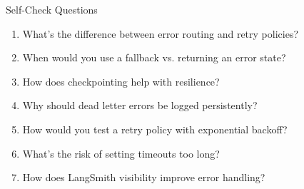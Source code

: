 \documentclass[aspectratio=169,11pt]{beamer}
\begin{document}
\begin{frame}{Self-Check Questions}
\setlength{\itemsep}{2pt}
\begin{enumerate}
\item What's the difference between error routing and retry policies?
\item When would you use a fallback vs. returning an error state?
\item How does checkpointing help with resilience?
\item Why should dead letter errors be logged persistently?
\item How would you test a retry policy with exponential backoff?
\item What's the risk of setting timeouts too long?
\item How does LangSmith visibility improve error handling?
\end{enumerate}
\end{frame}
\end{document}
